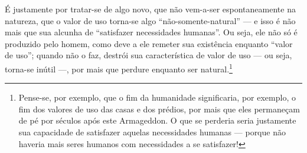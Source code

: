 \documentclass[12pt]{article}
\begin{document}



É justamente por tratar-se de algo novo, que não vem-a-ser espontaneamente na natureza, que o valor de uso torna-se algo ``não-somente-natural'' — e isso é não mais que sua alcunha de ``satisfazer necessidades humanas''. Ou seja, ele não só é produzido pelo homem, como deve a ele remeter sua existência enquanto ``valor de uso''; quando não o faz, destrói sua característica de valor de uso — ou seja, torna-se inútil —, por mais que perdure enquanto ser natural.\footnote{Pense-se, por exemplo, que o fim da humanidade significaria, por exemplo, o fim dos valores de uso das casas e dos prédios, por mais que eles permaneçam de pé por séculos após este Armageddon. O que se perderia seria justamente sua capacidade de satisfazer aquelas necessidades humanas --- porque não haveria mais seres humanos com necessidades a se satisfazer!}
\end{document}
